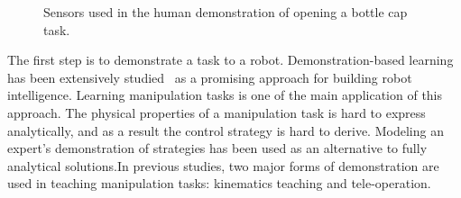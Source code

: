\begin{figure}
  \centering
    \caption{\scriptsize{Sensors used in the human demonstration of opening a bottle cap task.}}
  \label{fig:devices}
\end{figure}


The first step is to demonstrate a task to a robot. Demonstration-based learning has been extensively studied~\citep{calinon2007learning,dillmann2004teaching,kulic2012incremental}
as a promising approach for building robot
intelligence. %
Learning manipulation tasks is one of the main application of this
approach. The physical properties of a manipulation task is hard to
express analytically, and as a result the control strategy is hard to derive. Modeling an expert's demonstration
of strategies has been used as an alternative to fully analytical
solutions.In previous studies, two major forms of demonstration are used in teaching manipulation tasks: kinematics teaching and tele-operation.

